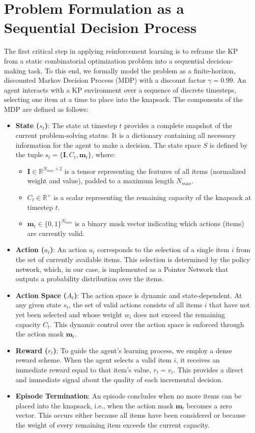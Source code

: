 \section{Problem Formulation as a Sequential Decision Process}
The first critical step in applying reinforcement learning is to reframe the KP from a static combinatorial optimization problem into a sequential decision-making task.
To this end, we formally model the problem as a finite-horizon, discounted Markov Decision Process (MDP) with a discount factor $\gamma = 0.99$.
An agent interacts with a KP environment over a sequence of discrete timesteps, selecting one item at a time to place into the knapsack.
The components of the MDP are defined as follows:
\begin{itemize}
    \item \textbf{State (\(s_t\))}: The state at timestep \(t\) provides a complete snapshot of the current problem-solving status.
It is a dictionary containing all necessary information for the agent to make a decision.
The state space \(S\) is defined by the tuple \(s_t = \{ \mathbf{I}, C_t, \mathbf{m}_t \}\), where:
    \begin{itemize}
        \item \(\mathbf{I} \in \mathbb{R}^{N_{max} \times 2}\) is a tensor representing the features of all items (normalized weight and value), padded to a maximum length \(N_{max}\).
        \item \(C_t \in \mathbb{R}^+\) is a scalar representing the remaining capacity of the knapsack at timestep \(t\).
        \item \(\mathbf{m}_t \in \{0, 1\}^{N_{max}}\) is a binary mask vector indicating which actions (items) are currently valid.
    \end{itemize}
    \item \textbf{Action (\(a_t\))}: An action \(a_t\) corresponds to the selection of a single item \(i\) from the set of currently available items.
This selection is determined by the policy network, which, in our case, is implemented as a Pointer Network that outputs a probability distribution over the items.
    \item \textbf{Action Space (\(A_t\))}: The action space is dynamic and state-dependent.
At any given state \(s_t\), the set of valid actions consists of all items \(i\) that have not yet been selected and whose weight \(w_i\) does not exceed the remaining capacity \(C_t\).
This dynamic control over the action space is enforced through the action mask \(\mathbf{m}_t\).
    \item \textbf{Reward (\(r_t\))}: To guide the agent's learning process, we employ a dense reward scheme.
When the agent selects a valid item \(i\), it receives an immediate reward equal to that item's value, \(r_t = v_i\).
This provides a direct and immediate signal about the quality of each incremental decision.
    \item \textbf{Episode Termination}: An episode concludes when no more items can be placed into the knapsack, i.e., when the action mask \(\mathbf{m}_t\) becomes a zero vector.
This occurs either because all items have been considered or because the weight of every remaining item exceeds the current capacity.
\end{itemize}
